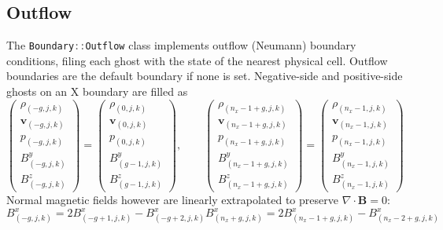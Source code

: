 \documentclass[11pt]{report}
\newcommand{\cpp}[1]{\lstinline[language=C++]{#1}}
\begin{document}
\subsection{Outflow}
The \cpp{Boundary::Outflow} class implements outflow (Neumann) boundary conditions, filing each ghost with the state of the nearest physical cell. Outflow boundaries are the default boundary if none is set.
Negative-side and positive-side ghosts  on an X boundary are filled as 
\begin{equation}
\begin{pmatrix}
\rho_{(-g,j,k)}\\
\mathbf{v}_{(-g,j,k)}\\
p_{(-g,j,k)}\\
B^y_{(-g,j,k)}\\
B^z_{(-g,j,k)}
\end{pmatrix} = \begin{pmatrix}
\rho_{(0,j,k)}\\
\mathbf{v}_{(0,j,k)}\\
p_{(0,j,k)}\\
B^y_{(g-1,j,k)}\\
B^z_{(g-1,j,k)}
\end{pmatrix}
,\qquad
\begin{pmatrix}
\rho_{(n_x-1+g,j,k)}\\
\mathbf{v}_{(n_x-1+g,j,k)}\\
p_{(n_x-1+g,j,k)}\\
B^y_{(n_x-1+g,j,k)}\\
B^z_{(n_x-1+g,j,k)}
\end{pmatrix} = \begin{pmatrix}
\rho_{(n_x-1,j,k)}\\
\mathbf{v}_{(n_x-1,j,k)}\\
p_{(n_x-1,j,k)}\\
B^y_{(n_x-1,j,k)}\\
B^z_{(n_x-1,j,k)}
\end{pmatrix}
\end{equation}
Normal magnetic fields however are linearly extrapolated to preserve $\nabla\cdot\mathbf{B} = 0$:
\begin{subequations}
\begin{equation} B^x_{(-g,j,k)} = 2B^x_{(-g+1,j,k)} - B^x_{(-g+2,j,k)}\end{equation}
\begin{equation} B^x_{(n_x+g,j,k)} = 2B^x_{(n_x-1+g,j,k)} - B^x_{(n_x-2+g,j,k)}\end{equation}
\end{subequations}
\end{document}
